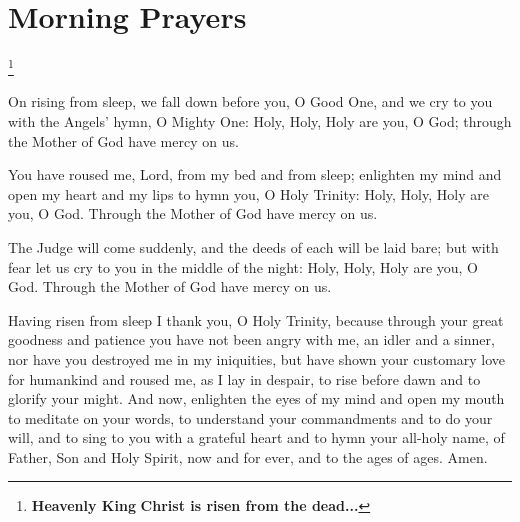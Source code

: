 \newpage
\section{Morning Prayers}

\throughtheprayers

\heavenlyking\footnote{ \textbf{Heavenly King}  \textbf{Christ is risen from the dead...} }


\trisagion



On rising from sleep, we fall down before you, O Good One, and we cry to you with the Angels' hymn, O Mighty One: Holy, Holy, Holy are you, O God; through the Mother of God have mercy on us.



You have roused me, Lord, from my bed and from sleep; enlighten my mind and open my heart and my lips to hymn you, O Holy Trinity: Holy, Holy, Holy are you, O God. Through the Mother of God have mercy on us.



The Judge will come suddenly, and the deeds of each will be laid bare; but with fear let us cry to you in the middle of the night: Holy, Holy, Holy are you, O God. Through the Mother of God have mercy on us.



\psalmonetwenty

\glorybothnow


\creed


Having risen from sleep I thank you, O Holy Trinity, because through your great goodness and patience you have not been angry with me, an idler and a sinner, nor have you destroyed me in my iniquities, but have shown your customary love for humankind and roused me, as I lay in despair, to rise before dawn and to glorify your might. And now, enlighten the eyes of my mind and open my mouth to meditate on your words, to understand your commandments and to do your will, and to sing to you with a grateful heart and to hymn your all-holy name, of Father, Son and Holy Spirit, now and for ever, and to the ages of ages. Amen.

